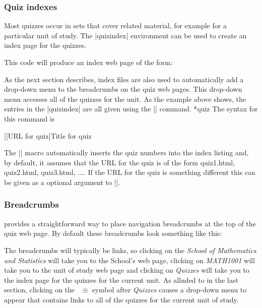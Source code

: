\documentclass[svgnames]{article}
\begin{document}
  \subsubsection{Quiz indexes}


  Most quizzes occur in sets that cover related material, for example
  for a particular unit of study. The \LatexCode|quizindex| environment can be
  used to create an index page for the quizzes.


  This code will produce an index web page of the form:


  As the next section describes, index files are also used to
  automatically add a drop-down menu to the breadcrumbs on the quiz web
  pages. This drop-down menu accesses all of the quizzes for the unit.
  As the example above shows, the entries in the \LatexCode|quizindex| are all
  given using the \LatexCode|\quiz| command.
  *{quiz}
  The syntax for this command is

  \begin{latexcode}
      \quiz|[URL for quiz]{Title for quiz}
  \end{latexcode}

  \noindent
  The \LatexCode|\quiz| macro automatically inserts the quiz numbers
  into the index listing and, by default, it assumes that the URL for the quiz
  is of the form \textsf{quiz1.html}, \textsf{quiz2.html},
  \textsf{quiz3.html}, .... If the URL for the quiz is something
  different this can be given as a optional argument to \LatexCode|\quiz|.

  \subsubsection{Breadcrumbs}\label{SS:breadcrumbs}

  \WebQuiz provides a straightforward way to place navigation breadcrumbs
  at the top of the quiz web page. By default these
  breadcrumbs look something like this:


  \noindent
  The breadcrumbs will typically be links, so clicking on the
  \textit{School of Mathematics and Statistics} will take you to the
  School's web page, clicking on \textit{MATH1001} will take you to the
  unit of study web page and clicking on \textit{Quizzes} will take you
  to the index page for the quizzes for the current unit. As alluded to
  in the last section, clicking on the~{\large\color{red} $\equiv$} symbol after
  \textit{Quizzes} causes a drop-down menu to appear that
  contains links to all of the quizzes for the current unit of study.
\end{document}
